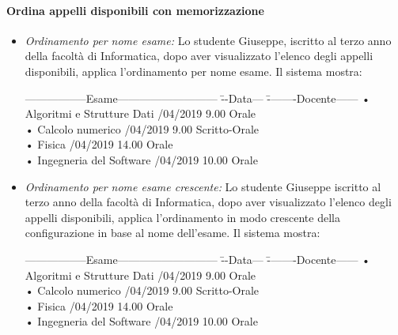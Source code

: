 \paragraph{Ordina appelli disponibili con memorizzazione}
\begin{itemize}
	\item \textit{Ordinamento per nome esame:}
	Lo studente Giuseppe, iscritto al terzo anno della facoltà di Informatica, dopo aver visualizzato l’elenco degli appelli disponibili, applica l’ordinamento per nome esame. Il sistema mostra:
	\begin{tabbing}
		\hspace{1cm}-----------------Esame--------------------------- \= --Data--- \= --------Docente------ \kill
		\hspace{1cm} • Algoritmi e Strutture Dati /04/2019 9.00\> \hspace{2cm} Orale \\
		\hspace{1cm} • Calcolo numerico /04/2019 9.00 \> \hspace{2cm} Scritto-Orale \\
		\hspace{1cm} • Fisica /04/2019 14.00\> \hspace{2cm} Orale  \\
		\hspace{1cm} • Ingegneria del Software /04/2019 10.00 \> \hspace{2cm} Orale \\
	\end{tabbing}
	
	\item \textit{Ordinamento per nome esame crescente:}
	Lo studente Giuseppe iscritto al terzo anno della facoltà di Informatica, dopo aver visualizzato l'elenco degli appelli disponibili, applica l'ordinamento in modo crescente della configurazione in base al nome dell’esame. Il sistema mostra:
	\begin{tabbing}
		\hspace{1cm}-----------------Esame--------------------------- \= --Data--- \= --------Docente------ \kill
		\hspace{1cm} • Algoritmi e Strutture Dati /04/2019 9.00\> \hspace{2cm} Orale \\
		\hspace{1cm} • Calcolo numerico /04/2019 9.00 \> \hspace{2cm} Scritto-Orale \\
		\hspace{1cm} • Fisica /04/2019 14.00\> \hspace{2cm} Orale  \\
		\hspace{1cm} • Ingegneria del Software /04/2019 10.00 \> \hspace{2cm} Orale \\
	\end{tabbing}
	

\end{itemize}
